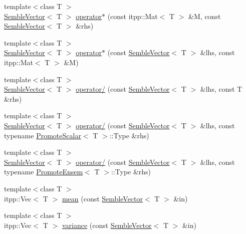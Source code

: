 \begin{DoxyCompactItemize}
\item 
{\footnotesize template$<$class T $>$ }\\\mbox{\hyperlink{structSEMBLE_1_1SembleVector}{Semble\+Vector}}$<$ T $>$ \mbox{\hyperlink{namespaceSEMBLE_a23db5b999663ed20c851efe625716b04}{operator$\ast$}} (const itpp\+::\+Mat$<$ T $>$ \&M, const \mbox{\hyperlink{structSEMBLE_1_1SembleVector}{Semble\+Vector}}$<$ T $>$ \&rhs)
\item 
{\footnotesize template$<$class T $>$ }\\\mbox{\hyperlink{structSEMBLE_1_1SembleVector}{Semble\+Vector}}$<$ T $>$ \mbox{\hyperlink{namespaceSEMBLE_a6edaf00d285c6d4509505f30c27df7ec}{operator$\ast$}} (const \mbox{\hyperlink{structSEMBLE_1_1SembleVector}{Semble\+Vector}}$<$ T $>$ \&lhs, const itpp\+::\+Mat$<$ T $>$ \&M)
\item 
{\footnotesize template$<$class T $>$ }\\\mbox{\hyperlink{structSEMBLE_1_1SembleVector}{Semble\+Vector}}$<$ T $>$ \mbox{\hyperlink{namespaceSEMBLE_a6f10a4c34958ccefef1fd26477673c01}{operator/}} (const \mbox{\hyperlink{structSEMBLE_1_1SembleVector}{Semble\+Vector}}$<$ T $>$ \&lhs, const T \&rhs)
\item 
{\footnotesize template$<$class T $>$ }\\\mbox{\hyperlink{structSEMBLE_1_1SembleVector}{Semble\+Vector}}$<$ T $>$ \mbox{\hyperlink{namespaceSEMBLE_a59e18a0f579ad8102ffdbc5110750d91}{operator/}} (const \mbox{\hyperlink{structSEMBLE_1_1SembleVector}{Semble\+Vector}}$<$ T $>$ \&lhs, const typename \mbox{\hyperlink{structSEMBLE_1_1PromoteScalar}{Promote\+Scalar}}$<$ T $>$\+::Type \&rhs)
\item 
{\footnotesize template$<$class T $>$ }\\\mbox{\hyperlink{structSEMBLE_1_1SembleVector}{Semble\+Vector}}$<$ T $>$ \mbox{\hyperlink{namespaceSEMBLE_a573e7bd88b8c454ba60e974c2b78cf81}{operator/}} (const \mbox{\hyperlink{structSEMBLE_1_1SembleVector}{Semble\+Vector}}$<$ T $>$ \&lhs, const typename \mbox{\hyperlink{structSEMBLE_1_1PromoteEnsem}{Promote\+Ensem}}$<$ T $>$\+::Type \&rhs)
\item 
{\footnotesize template$<$class T $>$ }\\itpp\+::\+Vec$<$ T $>$ \mbox{\hyperlink{namespaceSEMBLE_a5e097207a44d3902030de8bed204b0b8}{mean}} (const \mbox{\hyperlink{structSEMBLE_1_1SembleVector}{Semble\+Vector}}$<$ T $>$ \&in)
\item 
{\footnotesize template$<$class T $>$ }\\itpp\+::\+Vec$<$ T $>$ \mbox{\hyperlink{namespaceSEMBLE_a539a8eda87a4bdc8855dd9d5d2a2fb3a}{variance}} (const \mbox{\hyperlink{structSEMBLE_1_1SembleVector}{Semble\+Vector}}$<$ T $>$ \&in)

\end{DoxyCompactItemize}
